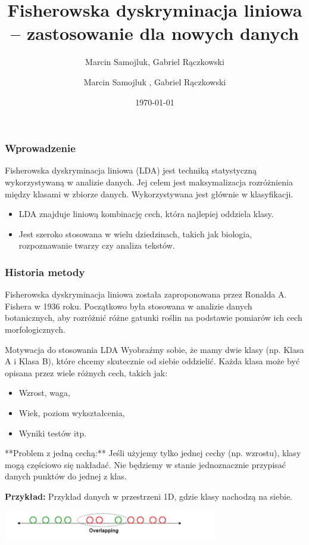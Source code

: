 \documentclass{beamer}
\title{Fisherowska dyskryminacja liniowa – zastosowanie dla nowych danych}
\author{Marcin Samojluk, Gabriel Rączkowski}
\author{Marcin Samojluk , Gabriel Rączkowski}
\date{\today}
\begin{document}
\begin{frame}
    \titlepage
\end{frame}

\begin{frame}
    \frametitle{Wprowadzenie}
    Fisherowska dyskryminacja liniowa (LDA) jest techniką statystyczną wykorzystywaną w analizie danych. Jej celem jest maksymalizacja rozróżnienia między klasami w zbiorze danych. Wykorzystywana jest głównie w klasyfikacji.
    \begin{itemize}
        \item LDA znajduje liniową kombinację cech, która najlepiej oddziela klasy.
        \item Jest szeroko stosowana w wielu dziedzinach, takich jak biologia, rozpoznawanie twarzy czy analiza tekstów.
    \end{itemize}
\end{frame}

\begin{frame}
    \frametitle{Historia metody}
    Fisherowska dyskryminacja liniowa została zaproponowana przez Ronalda A. Fishera w 1936 roku. Początkowo była stosowana w analizie danych botanicznych, aby rozróżnić różne gatunki roślin na podstawie pomiarów ich cech morfologicznych.
\end{frame}





\begin{frame}{Motywacja do stosowania LDA}
    \small
    Wyobraźmy sobie, że mamy dwie klasy (np. Klasa A i Klasa B), które chcemy skutecznie od siebie oddzielić. Każda klasa może być opisana przez wiele różnych cech, takich jak:
    \begin{itemize}
        \item Wzrost, waga,
        \item Wiek, poziom wykształcenia,
        \item Wyniki testów itp.
    \end{itemize}
    
    \bigskip
    **Problem z jedną cechą:** Jeśli użyjemy tylko jednej cechy (np. wzrostu), klasy mogą częściowo się nakładać. Nie będziemy w stanie jednoznacznie przypisać danych punktów do jednej z klas.

    \bigskip
    \textbf{Przykład:} Przykład danych 	w przestrzeni 1D, gdzie klasy nachodzą na siebie.
    
    \bigskip
    \includegraphics[width=0.7\textwidth]{overlapping.png} 

\end{frame}
\end{document}
